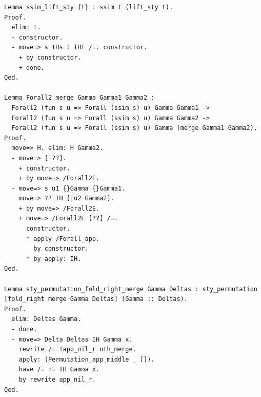 \begin{lstlisting}[style=authorcoq]
Lemma ssim_lift_sty {t} : ssim t (lift_sty t).
Proof.
  elim: t.
  - constructor.
  - move=> s IHs t IHt /=. constructor.
    + by constructor.
    + done.
Qed.

Lemma Forall2_merge Gamma Gamma1 Gamma2 :
  Forall2 (fun s u => Forall (ssim s) u) Gamma Gamma1 ->
  Forall2 (fun s u => Forall (ssim s) u) Gamma Gamma2 ->
  Forall2 (fun s u => Forall (ssim s) u) Gamma (merge Gamma1 Gamma2).
Proof.
  move=> H. elim: H Gamma2.
  - move=> [|??].
    + constructor.
    + by move=> /Forall2E.
  - move=> s u1 {}Gamma {}Gamma1.
    move=> ?? IH [|u2 Gamma2].
    + by move=> /Forall2E.
    + move=> /Forall2E [??] /=.
      constructor.
      * apply /Forall_app.
        by constructor.
      * by apply: IH.
Qed.

Lemma sty_permutation_fold_right_merge Gamma Deltas : sty_permutation [fold_right merge Gamma Deltas] (Gamma :: Deltas).
Proof.
  elim: Deltas Gamma.
  - done.
  - move=> Delta Deltas IH Gamma x.
    rewrite /= !app_nil_r nth_merge.
    apply: (Permutation_app_middle _ []).
    have /= := IH Gamma x.
    by rewrite app_nil_r.
Qed.


\end{lstlisting}
